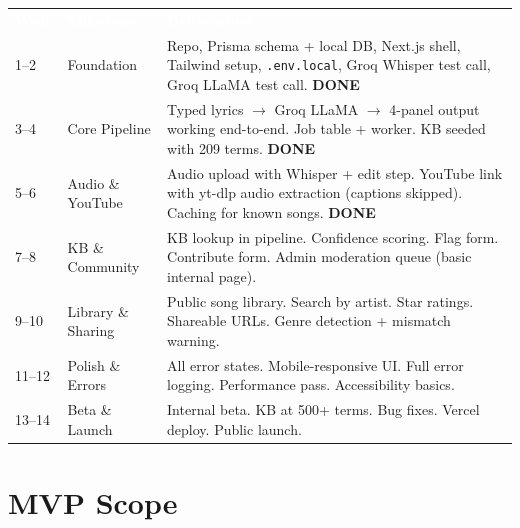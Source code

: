 \documentclass[12pt, a4paper]{article}
\begin{document}
\renewcommand{\arraystretch}{1.5}
\begin{center}
\begin{tabular}{C{1.3cm} L{3.5cm} L{8.7cm}}
  \textcolor{white}{\textbf{Week}} &
  \textcolor{white}{\textbf{Milestone}} &
  \textcolor{white}{\textbf{Deliverables}} \\
  1--2 & \textcolor{successgreen}{Foundation} &
  Repo, Prisma schema + local DB, Next.js shell, Tailwind setup,
  \texttt{.env.local}, Groq Whisper test call, Groq LLaMA test call.
  \textcolor{successgreen}{\textbf{DONE}} \\
  3--4 & \textcolor{successgreen}{Core Pipeline} &
  Typed lyrics $\to$ Groq LLaMA $\to$ 4-panel output working end-to-end.
  Job table + worker. KB seeded with 209 terms.
  \textcolor{successgreen}{\textbf{DONE}} \\
  5--6 & \textcolor{successgreen}{Audio \& YouTube} &
  Audio upload with Whisper + edit step. YouTube link with
  yt-dlp audio extraction (captions skipped). Caching for known songs.
  \textcolor{successgreen}{\textbf{DONE}} \\
  7--8 & KB \& Community &
  KB lookup in pipeline. Confidence scoring. Flag form. Contribute
  form. Admin moderation queue (basic internal page). \\
  9--10 & Library \& Sharing &
  Public song library. Search by artist. Star ratings. Shareable
  URLs. Genre detection + mismatch warning. \\
  11--12 & Polish \& Errors &
  All error states. Mobile-responsive UI. Full error logging.
  Performance pass. Accessibility basics. \\
  13--14 & Beta \& Launch &
  Internal beta. KB at 500+ terms. Bug fixes. Vercel deploy.
  Public launch. \\
\end{tabular}
\end{center}

\section{MVP Scope}
\end{document}
